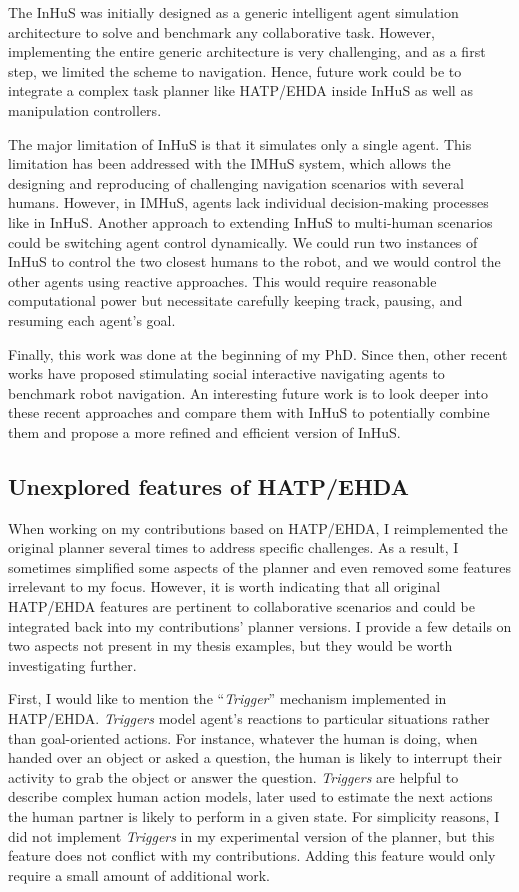 The InHuS was initially designed as a generic intelligent agent simulation architecture to solve and benchmark any collaborative task. However, implementing the entire generic architecture is very challenging, and as a first step, we limited the scheme to navigation. Hence, future work could be to integrate a complex task planner like HATP/EHDA inside InHuS as well as manipulation controllers. 

The major limitation of InHuS is that it simulates only a single agent. This limitation has been addressed with the IMHuS system, which allows the designing and reproducing of challenging navigation scenarios with several humans. However, in IMHuS, agents lack individual decision-making processes like in InHuS. Another approach to extending InHuS to multi-human scenarios could be switching agent control dynamically. We could run two instances of InHuS to control the two closest humans to the robot, and we would control the other agents using reactive approaches. This would require reasonable computational power but necessitate carefully keeping track, pausing, and resuming each agent's goal.

Finally, this work was done at the beginning of my PhD. Since then, other recent works have proposed stimulating social interactive navigating agents to benchmark robot navigation. An interesting future work is to look deeper into these recent approaches and compare them with InHuS to potentially combine them and propose a more refined and efficient version of InHuS. 

\subsection*{Unexplored features of HATP/EHDA}

When working on my contributions based on HATP/EHDA, I reimplemented the original planner several times to address specific challenges. As a result, I sometimes simplified some aspects of the planner and even removed some features irrelevant to my focus. However, it is worth indicating that all original HATP/EHDA features are pertinent to collaborative scenarios and could be integrated back into my contributions' planner versions. I provide a few details on two aspects not present in my thesis examples, but they would be worth investigating further.

First, I would like to mention the ``\textit{Trigger}'' mechanism implemented in HATP/EHDA. \textit{Triggers} model agent's reactions to particular situations rather than goal-oriented actions. For instance, whatever the human is doing, when handed over an object or asked a question, the human is likely to interrupt their activity to grab the object or answer the question. \textit{Triggers} are helpful to describe complex human action models, later used to estimate the next actions the human partner is likely to perform in a given state. For simplicity reasons, I did not implement \textit{Triggers} in my experimental version of the planner, but this feature does not conflict with my contributions. Adding this feature would only require a small amount of additional work.

